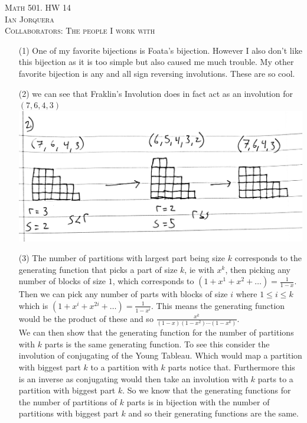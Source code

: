 \documentclass[12pt]{amsart}
\theoremstyle{definition}
\begin{document}
\begin{center}
    \textsc{Math 501. HW 14\\ Ian Jorquera\\ Collaborators: The people I work with }
\end{center}
\vspace{1em}

\begin{itemize}

\item[(1)] %
One of my favorite bijections is Foata's bijection. However I also don't like this bijection as it is too simple but also caused me much trouble. My other favorite bijection is any and all sign reversing involutions. These are so cool.\\

\item[(2)] %
we can see that Fraklin's Involution does in fact act as an involution for $(7,6,4,3)$\\
\includegraphics[width=.9\textwidth]{202212011629101000.jpg}

\item[(3)] %
The number of partitions with largest part being size $k$ corresponds to the generating function that picks a part of size $k$, ie with $x^k$, then picking any number of blocks of size $1$, which corresponds to $(1+x^1+x^2+\dots)=\frac{1}{1-x}$. Then we can pick any number of parts with blocks of size $i$ where $1\leq i \leq k$ which is $(1+x^i+x^{2i}+\dots)=\frac{1}{1-x^i}$. This means the generating function would be the product of these and so $\frac{x^k}{(1-x)(1-x^2)\cdots (1-x^k)}$.\\

We can then show that the generating function for the number of partitions with $k$ parts is the same generating function. To see this consider the involution of conjugating of the Young Tableau. Which would map a partition with biggest part $k$ to a partition with $k$ parts notice that. Furthermore this is an inverse as conjugating would then take an involution with $k$ parts to a partition with biggest part $k$. So we know that the generating functions for the number of partitions of $k$ parts is in bijection with the number of partitions with biggest part $k$ and so their generating functions are the same. \\


\end{itemize}
\end{document}
